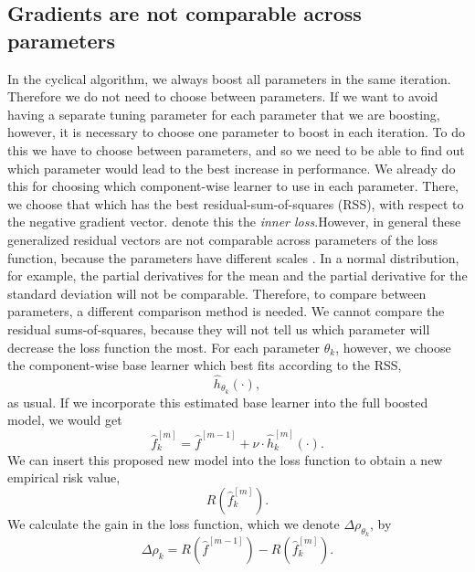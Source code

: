\subsection{Gradients are not comparable across parameters}
In the cyclical algorithm, we always boost all parameters in the same iteration. Therefore we do not need to choose between parameters. If we want to avoid having a separate tuning parameter for each parameter that we are boosting, however, it is necessary to choose one parameter to boost in each iteration. To do this we have to choose between parameters, and so we need to be able to find out which parameter would lead to the best increase in performance. We already do this for choosing which component-wise learner to use in each parameter. There, we choose that which has the best residual-sum-of-squares (RSS), with respect to the negative gradient vector. \citet{thomas2018} denote this the \textit{inner loss}.However, in general these generalized residual vectors are not comparable across parameters of the loss function, because the parameters have different scales \citep{thomas2018}. In a normal distribution, for example, the partial derivatives for the mean and the partial derivative for the standard deviation will not be comparable. Therefore, to compare between parameters, a different comparison method is needed. We cannot compare the residual sums-of-squares, because they will not tell us which parameter will decrease the loss function the most. For each parameter $\theta_k$, however, we choose the component-wise base learner which best fits according to the RSS,
\begin{equation}
    \hat{h}_{\theta_k}(\cdot),
\end{equation}
as usual. If we incorporate this estimated base learner into the full boosted model, we would get
\begin{equation}
    \hat{f}^{[m]}_{k}=\hat{f}^{[m-1]}+\nu\cdot\hat{h}^{[m]}_{k}(\cdot).
\end{equation}
We can insert this proposed new model into the loss function to obtain a new empirical risk value,
\begin{equation}
    R\left(\hat{f}^{[m]}_{k}\right).
\end{equation}
We calculate the gain in the loss function, which we denote $\Delta\rho_{\theta_k}$, by
\begin{equation}
    \Delta\rho_{k}=R\left(\hat{f}^{[m-1]}\right)-R\left(\hat{f}^{[m]}_{k}\right).
\end{equation}
